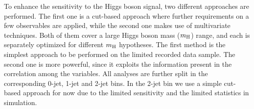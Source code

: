 To enhance the sensitivity to the Higgs boson signal, two different approaches 
are performed. The first one is a cut-based approach where further requirements 
on a few observables are applied, while the second one makes use of
multivariate techniques. Both of them cover a large Higgs boson mass
($m_{\rm{H}}$) range, and each is separately optimized for different
$m_{\rm{H}}$ hypotheses. The first method is the simplest approach to
be performed on the limited recorded data sample. The second one is
more powerful, since it exploits the information present in the
correlation among the variables. All analyses are further split in 
the corresponding 0-jet, 1-jet and 2-jet bins. In the 2-jet bin we use 
a simple cut-based approach for now due to the limited 
sensitivity and the limited statistics in simulation. 

